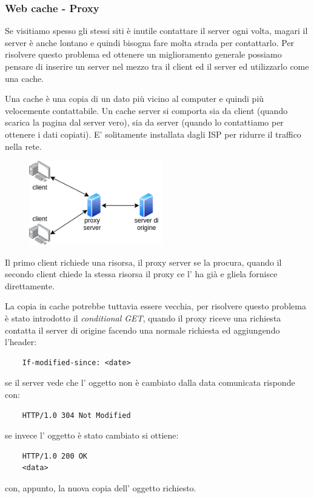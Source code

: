 \subsubsection{Web cache - Proxy}
Se visitiamo spesso gli stessi siti è inutile contattare il server ogni volta, magari il server è anche lontano e quindi bisogna fare molta strada per contattarlo.
Per risolvere questo problema ed ottenere un miglioramento generale possiamo pensare di inserire un server nel mezzo tra il client ed il server ed utilizzarlo come una cache.

Una cache è una copia di un dato più vicino al computer e quindi più velocemente contattabile.
Un cache server si comporta sia da client (quando scarica la pagina dal server vero), sia da server (quando lo contattiamo per ottenere i dati copiati).
E' solitamente installata dagli ISP per ridurre il traffico nella rete.

\begin{figure}[H]
    \centering
    \includegraphics[width=220px]{images/2_Applicazioni_di_rete/cache_example.png}
\end{figure}
Il primo client richiede una risorsa, il proxy server se la procura, quando il secondo client chiede la stessa risorsa il proxy ce l' ha già e gliela fornisce direttamente.

La copia in cache potrebbe tuttavia essere vecchia, per risolvere questo problema è stato introdotto il \emph{conditional GET}, quando il proxy riceve una richiesta contatta il server di origine facendo una normale richiesta ed aggiungendo l'header:
\begin{verbatim}
    If-modified-since: <date>
\end{verbatim}
se il server vede che l' oggetto non è cambiato dalla data comunicata risponde con:
\begin{verbatim}
    HTTP/1.0 304 Not Modified
\end{verbatim}
se invece l' oggetto è stato cambiato si ottiene:
\begin{verbatim}
    HTTP/1.0 200 OK
    <data>
\end{verbatim}
con, appunto, la nuova copia dell' oggetto richiesto.


